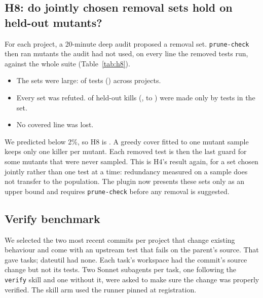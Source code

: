 \subsection{H8: do jointly chosen removal sets hold on held-out mutants?}



For each project, a 20-minute deep audit proposed a removal set. \texttt{prune-check} then ran mutants the audit had not used, on every line the removed tests run, against the whole suite (Table~\ref{tab:h8}).
\begin{itemize}
  \item The sets were large: \HEightCandidates{} of \HEightTests{} tests (\HEightCandidateShare{}) across \HEightProjects{} projects.
  \item Every set was refuted. \HEightLost{} of \HEightKilled{} held-out kills (\HEightLostShare{}, \HEightLostShareLo{} to \HEightLostShareHi{}) were made only by tests in the set.
  \item No covered line was lost.
\end{itemize}
We predicted below 2\%, so H8 is \HEightSupported{}. A greedy cover fitted to one mutant sample keeps only one killer per mutant. Each removed test is then the last guard for some mutants that were never sampled. This is H4's result again, for a set chosen jointly rather than one test at a time: redundancy measured on a sample does not transfer to the population. The plugin now presents these sets only as an upper bound and requires \texttt{prune-check} before any removal is suggested.

\subsection{Verify benchmark}



We selected the two most recent commits per project that change existing behaviour and come with an upstream test that fails on the parent's source. That gave \VTasks{} tasks; dateutil had none. Each task's workspace had the commit's source change but not its tests. Two Sonnet subagents per task, one following the \texttt{verify} skill and one without it, were asked to make sure the change was properly verified. The skill arm used the runner pinned at registration.

